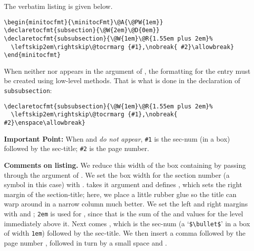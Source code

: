 \documentclass[10pt]{article}
\edef\amtIndent{\the\parindent}
\begin{document}
\begin{center}\minitocFmtvi
{}%
\begin{minipage}[c]{.8\linewidth}
\insertminitoc[CandM]
\end{minipage}
\end{center}
The verbatim listing is given below.
\begin{Verbatim}[xleftmargin=\amtIndent,fontsize=\small]
\begin{minitocfmt}{\minitocFmt}\@A{\@PW{1em}}
\declaretocfmt{subsection}{\@W{2em}\@D{0em}}
\declaretocfmt{subsubsection}{\@W{1em}\@R{1.55em plus 2em}%
  \leftskip2em\rightskip\@tocrmarg {#1},\nobreak{ #2}\allowbreak}
\end{minitocfmt}
\end{Verbatim}
\noindent When neither  nor  appears in the
 argument of , the formatting for the
entry must be created using low-level methods. That is what is done in the
declaration of \texttt{subsubsection}:
\begin{Verbatim}[xleftmargin=\amtIndent,fontsize=\small]
\declaretocfmt{subsubsection}{\@W{1em}\@R{1.55em plus 2em}%
  \leftskip2em\rightskip\@tocrmarg {#1},\nobreak{ #2}\enspace\allowbreak}
\end{Verbatim}
\textbf{Important Point:} When  and  \emph{do not appear},
\texttt{\#1} is the sec-num (in a box) followed by the sec-title;
\texttt{\#2} is the page number.



\newtopic\noindent\textbf{Comments on listing.} We reduce this width of the
box containing  by passing  through the
argument of . We set the box width for the section number (a symbol in
this case) with .  takes it argument and defines
, which sets the right margin of the section-title; here, we
place a little rubber glue so the title can warp around in a narrow column
much better. We set the left and right margins with  and
; \texttt{2em} is used for , since
that is the sum of the  and  values for the level immediately
above it. Next comes \texttt{}, which is the sec-num (a
`\verb~$\bullet$~' in a box of width \texttt{1em}) followed by the sec-title.
We then insert a comma followed by the page number \texttt{}, followed
in turn by a small space and .
\end{document}
